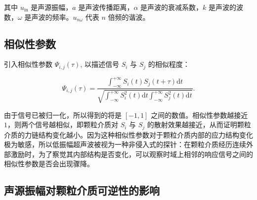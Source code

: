 其中 $u_{\text{in}}$ 是声源振幅，$a$ 是声波传播距离，$\alpha$ 是声波的衰减系数，$k$ 是声波的波数，$\omega$ 是声波的频率。$u_{n\omega}$ 代表 $n$ 倍频的谐波。


\subsection{相似性参数}

引入相似性参数 $\Psi_{i,j}(\tau)$, 以描述信号 $S_{i}$ 与 $S_{j}$ 的相似程度\cite{PhysRevLett.90.174302}：

\begin{equation}
  \Psi_{i,j}(\tau) = \frac{\int_{-\infty}^{+\infty}S_{i}(t)S_{j}(t+\tau)\mathrm{d}t}{\sqrt{\int_{-\infty}^{+\infty}S_{i}^{2}(t)\mathrm{d}t\int_{-\infty}^{+\infty}S_{j}^{2}(t)\mathrm{d}t}}.
\end{equation}

由于信号已被归一化，所以得到的将是 $[-1,1]$ 之间的数值。相似性参数越接近 $1$，则两个信号越相似，即颗粒介质对 $S_{i}$ 与 $S_{j}$ 的散射效果越接近，从而证明颗粒介质的力链结构变化越小。因为这种相似性参数对于颗粒介质内部的应力结构变化极为敏感，所以低振幅超声波被视为一种非侵入式的探针：在颗粒介质经历连续外部激励时，为了察觉其内部结构是否变化，可以观察时域上相邻的响应信号之间的相似性参数是否会出现骤降。

\subsection{声源振幅对颗粒介质可逆性的影响}